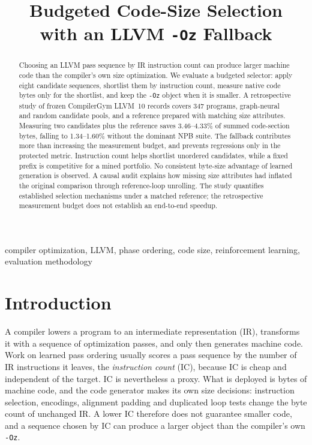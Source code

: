 \documentclass[conference,a4paper]{IEEEtran}
\begin{document}
\title{Budgeted Code-Size Selection\\
with an LLVM \texttt{-Oz} Fallback}

\author{
}

\maketitle

\begin{abstract}
Choosing an LLVM pass sequence by IR instruction count can produce
larger machine code than the compiler's own size optimization. We
evaluate a budgeted selector: apply eight candidate sequences,
shortlist them by instruction count, measure native code bytes only
for the shortlist, and keep the \texttt{-Oz} object when it is smaller.
A retrospective study of frozen CompilerGym LLVM~10 records covers
347 programs, graph-neural and random candidate pools, and a reference
prepared with matching size attributes. Measuring two candidates plus
the reference saves 3.46--4.33\% of summed code-section bytes, falling
to 1.34--1.60\% without the dominant NPB suite. The fallback contributes
more than increasing the measurement budget, and prevents regressions
only in the protected metric. Instruction count helps shortlist
unordered candidates, while a fixed prefix is competitive for a mined
portfolio. No consistent byte-size advantage of learned generation is
observed. A causal audit explains how missing size attributes had
inflated the original comparison through reference-loop unrolling.
The study quantifies established selection mechanisms under a matched
reference; the retrospective measurement budget does not establish
an end-to-end speedup.
\end{abstract}

\begin{IEEEkeywords}
compiler optimization, LLVM, phase ordering, code size, reinforcement
learning, evaluation methodology
\end{IEEEkeywords}

\section{Introduction}
A compiler lowers a program to an intermediate representation (IR),
transforms it with a sequence of optimization passes, and only then
generates machine code. Work on learned pass ordering usually scores a
pass sequence by the number of IR instructions it leaves, the
\emph{instruction count} (IC), because IC is cheap and independent of
the target. IC is nevertheless a proxy. What is deployed is bytes of
machine code, and the code generator makes its own size decisions:
instruction selection, encodings, alignment padding and duplicated
loop tests change the byte count of unchanged IR. A lower IC therefore
does not guarantee smaller code, and a sequence chosen by IC can
produce a larger object than the compiler's own \texttt{-Oz}.
\end{document}
